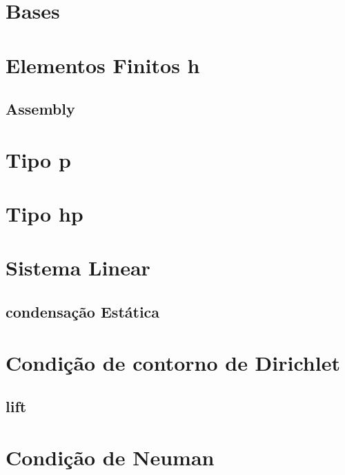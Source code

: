 \section{Bases}
\section{Elementos Finitos h}
\subsection{Assembly}
\section{Tipo p}
\section{Tipo hp}
\section{Sistema Linear}
\subsection{condensação Estática}
\section{Condição de contorno de Dirichlet}
\subsection{lift}
\section{Condição de Neuman}